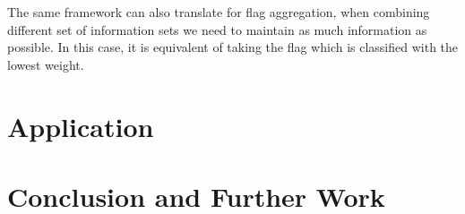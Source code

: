 \documentclass[nojss]{jss}
\begin{document}
The same framework can also translate for flag aggregation, when
combining different set of information sets we need to maintain as
much information as possible. In this case, it is equivalent of taking
the flag which is classified with the lowest weight.


\section{Application}



\section{Conclusion and Further Work}
\end{document}
